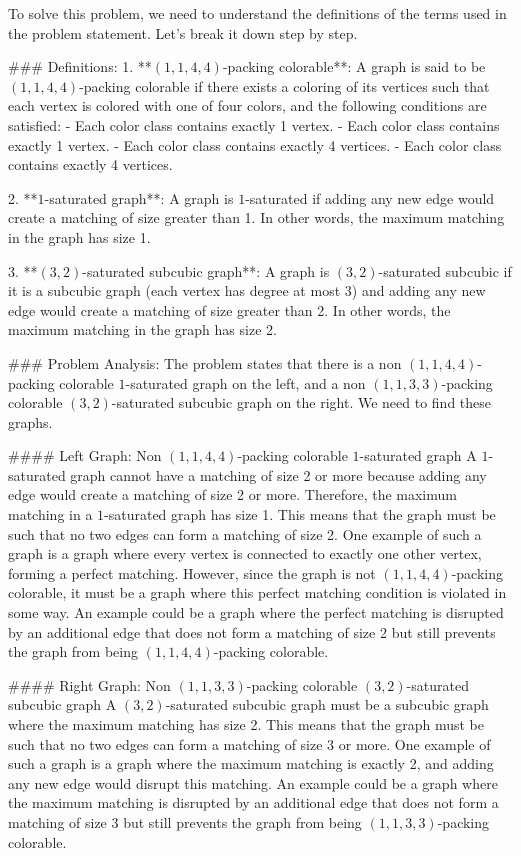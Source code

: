 To solve this problem, we need to understand the definitions of the terms used in the problem statement. Let's break it down step by step.

### Definitions:
1. **$(1,1,4,4)$-packing colorable**: A graph is said to be $(1,1,4,4)$-packing colorable if there exists a coloring of its vertices such that each vertex is colored with one of four colors, and the following conditions are satisfied:
   - Each color class contains exactly 1 vertex.
   - Each color class contains exactly 1 vertex.
   - Each color class contains exactly 4 vertices.
   - Each color class contains exactly 4 vertices.
   
2. **$1$-saturated graph**: A graph is $1$-saturated if adding any new edge would create a matching of size greater than 1. In other words, the maximum matching in the graph has size 1.

3. **$(3,2)$-saturated subcubic graph**: A graph is $(3,2)$-saturated subcubic if it is a subcubic graph (each vertex has degree at most 3) and adding any new edge would create a matching of size greater than 2. In other words, the maximum matching in the graph has size 2.

### Problem Analysis:
The problem states that there is a non $(1,1,4,4)$-packing colorable $1$-saturated graph on the left, and a non $(1,1,3,3)$-packing colorable $(3,2)$-saturated subcubic graph on the right. We need to find these graphs.

#### Left Graph: Non $(1,1,4,4)$-packing colorable $1$-saturated graph
A $1$-saturated graph cannot have a matching of size 2 or more because adding any edge would create a matching of size 2 or more. Therefore, the maximum matching in a $1$-saturated graph has size 1. This means that the graph must be such that no two edges can form a matching of size 2. One example of such a graph is a graph where every vertex is connected to exactly one other vertex, forming a perfect matching. However, since the graph is not $(1,1,4,4)$-packing colorable, it must be a graph where this perfect matching condition is violated in some way. An example could be a graph where the perfect matching is disrupted by an additional edge that does not form a matching of size 2 but still prevents the graph from being $(1,1,4,4)$-packing colorable.

#### Right Graph: Non $(1,1,3,3)$-packing colorable $(3,2)$-saturated subcubic graph
A $(3,2)$-saturated subcubic graph must be a subcubic graph where the maximum matching has size 2. This means that the graph must be such that no two edges can form a matching of size 3 or more. One example of such a graph is a graph where the maximum matching is exactly 2, and adding any new edge would disrupt this matching. An example could be a graph where the maximum matching is disrupted by an additional edge that does not form a matching of size 3 but still prevents the graph from being $(1,1,3,3)$-packing colorable.


